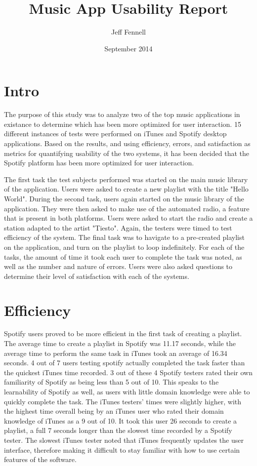 \documentclass[12pt]{report}
\begin{document}
\title{Music App Usability Report}
\author{Jeff Fennell}
\date{September 2014}
\maketitle

\section{Intro}

The purpose of this study was to analyze two of the top music applications in existance to determine which has been more optimized for user interaction. 15 different instances of tests were performed on iTunes and Spotify desktop applications. Based on the results, and using efficiency, errors, and satisfaction as metrics for quantifying usability of the two systems, it has been decided that the Spotify platform has been more optimized for user interaction.

The first task the test subjects performed was started on the main music library of the application. Users were asked to create a new playlist with the title "Hello World".  During the second task, users again started on the music library of the application. They were then asked to make use of the automated radio, a feature that is present in both platforms. Users were asked to start the radio and create a station adapted to the artist "Tiesto". Again, the testers were timed to test efficiency of the system. The final task was to havigate to a pre-created playlist on the application, and turn on the playlist to loop indefinitely. For each of the tasks, the amount of time it took each user to complete the task was noted, as well as the number and nature of errors. Users were also asked questions to determine their level of satisfaction with each of the systems.

\section{Efficiency}

Spotify users proved to be more efficient in the first task of creating a playlist. The average time to create a playlist in Spotify was 11.17 seconds, while the average time to perform the same task in iTunes took an average of 16.34 seconds. 4 out of 7 users testing spotify actually completed the task faster than the quickest iTunes time recorded. 3 out of these 4 Spotify testers rated their own familiarity of Spotify as being less than 5 out of 10. This speaks to the learnability of Spotify as well, as users with little domain knowledge were able to quickly complete the task. The iTunes testers' times were slightly higher, with the highest time overall being by an iTunes user who rated their domain knowledge of iTunes as a 9 out of 10. It took this user 26 seconds to create a playlist, a full 7 seconds longer than the slowest time recorded by a Spotify tester. The slowest iTunes tester noted that iTunes frequently updates the user interface, therefore making it difficult to stay familiar with how to use certain features of the software.
\end{document}
